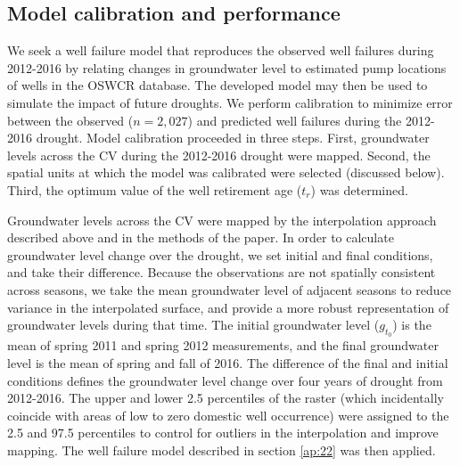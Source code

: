 \subsection{Model calibration and performance}
\label{ap_a_calib}

We seek a well failure model that reproduces the observed well failures during 2012-2016 by relating changes in groundwater level to estimated pump locations of wells in the OSWCR database. The developed model may then be used to simulate the impact of future droughts. We perform calibration to minimize error between the observed ($n \! = \! 2,027$) and predicted well failures during the 2012-2016 drought. Model calibration proceeded in three steps. First, groundwater levels across the CV during the 2012-2016 drought were mapped. Second, the spatial units at which the model was calibrated were selected (discussed below). Third, the optimum value of the well retirement age ($t_r$) was determined.

Groundwater levels across the CV were mapped by the interpolation approach described above and in the methods of the paper. In order to calculate groundwater level change over the drought, we set initial and final conditions, and take their difference. Because the observations are not spatially consistent across seasons, we take the mean groundwater level of adjacent seasons to reduce variance in the interpolated surface, and provide a more robust representation of groundwater levels during that time. The initial groundwater level ($g_{t_0}$) is the mean of spring 2011 and spring 2012 measurements, and the final groundwater level is the mean of spring and fall of 2016. The difference of the final and initial conditions defines the groundwater level change over four years of drought from 2012-2016. The upper and lower 2.5 percentiles of the raster (which incidentally coincide with areas of low to zero domestic well occurrence) were assigned to the 2.5 and 97.5 percentiles to control for outliers in the interpolation and improve mapping. The well failure model described in section \ref{ap:22} was then applied.  

